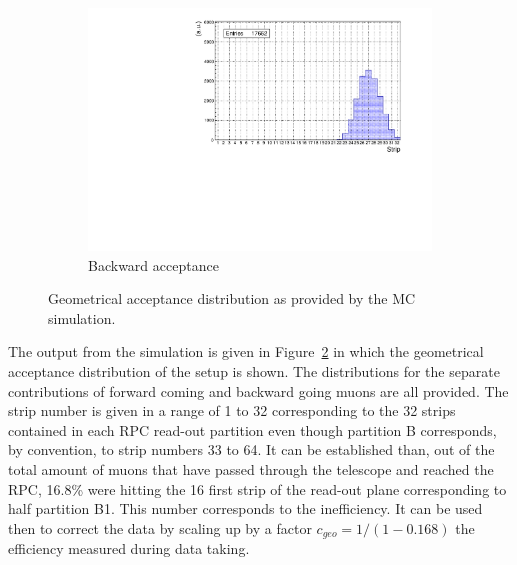 \begin{figure}
\begin{subfigure}{\linewidth}
			\includegraphics[width = \linewidth]{fig/chapt5/Geometrical-acceptance-backward.pdf}
			\caption{\label{fig:SimResult:C} Backward acceptance}
		\end{subfigure}
		\caption{\label{fig:SimResult} Geometrical acceptance distribution as provided by the \acl{MC} simulation.}
	\end{figure}
	
	The output from the simulation is given in Figure~\ref{fig:SimResult} in which the geometrical acceptance distribution of the setup is shown. The distributions for the separate contributions of forward coming and backward going muons are all provided. The strip number is given in a range of 1 to 32 corresponding to the 32 strips contained in each RPC read-out partition even though partition B corresponds, by convention, to strip numbers 33 to 64. It can be established than, out of the total amount of muons that have passed through the telescope and reached the RPC, 16.8\% were hitting the 16 first strip of the read-out plane corresponding to half partition B1. This number corresponds to the inefficiency. It can be used then to correct the data by scaling up by a factor $c_{geo} = 1/(1-0.168)$ the efficiency measured during data taking.
	
